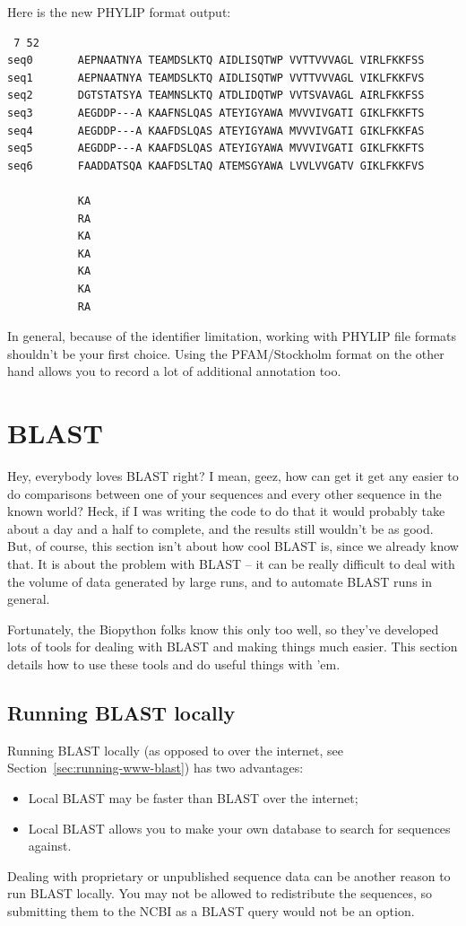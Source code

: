 \documentclass{report}
\begin{document}
\noindent Here is the new PHYLIP format output:
\begin{verbatim}
 7 52
seq0       AEPNAATNYA TEAMDSLKTQ AIDLISQTWP VVTTVVVAGL VIRLFKKFSS
seq1       AEPNAATNYA TEAMDSLKTQ AIDLISQTWP VVTTVVVAGL VIKLFKKFVS
seq2       DGTSTATSYA TEAMNSLKTQ ATDLIDQTWP VVTSVAVAGL AIRLFKKFSS
seq3       AEGDDP---A KAAFNSLQAS ATEYIGYAWA MVVVIVGATI GIKLFKKFTS
seq4       AEGDDP---A KAAFDSLQAS ATEYIGYAWA MVVVIVGATI GIKLFKKFAS
seq5       AEGDDP---A KAAFDSLQAS ATEYIGYAWA MVVVIVGATI GIKLFKKFTS
seq6       FAADDATSQA KAAFDSLTAQ ATEMSGYAWA LVVLVVGATV GIKLFKKFVS

           KA
           RA
           KA
           KA
           KA
           KA
           RA
\end{verbatim}

\noindent In general, because of the identifier limitation, working with PHYLIP file formats shouldn't be your first choice.  Using the PFAM/Stockholm format on the other hand allows you to record a lot of additional annotation too.

\chapter{BLAST}
\label{chapter:blast}
Hey, everybody loves BLAST right? I mean, geez, how can get it get any easier to do comparisons between one of your sequences and every other sequence in the known world? Heck, if I was writing the code to do that it would probably take about a day and a half to complete, and the results still wouldn't be as good. But, of course, this section isn't about how cool BLAST is, since we already know that. It is about the problem with BLAST -- it can be really difficult to deal with the volume of data generated by large runs, and to automate BLAST runs in general.

Fortunately, the Biopython folks know this only too well, so they've developed lots of tools for dealing with BLAST and making things much easier. This section details how to use these tools and do useful things with 'em.

\section{Running BLAST locally}
\label{sec:running-local-blast}

Running BLAST locally (as opposed to over the internet, see
Section~\ref{sec:running-www-blast}) has two advantages:
\begin{itemize}
\item Local BLAST may be faster than BLAST over the internet;
\item Local BLAST allows you to make your own database to search for sequences against.
\end{itemize}
Dealing with proprietary or unpublished sequence data can be another reason to run BLAST locally.  You may not be allowed to redistribute the sequences, so submitting them to the NCBI as a BLAST query would not be an option.
\end{document}
